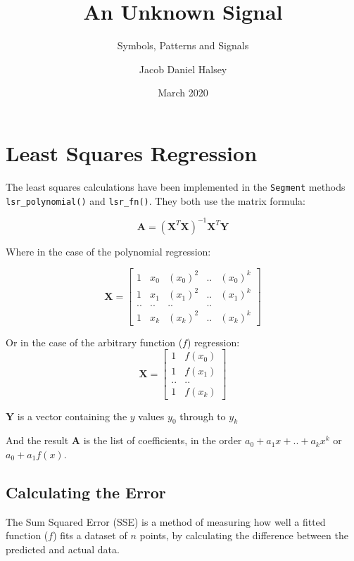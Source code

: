 \documentclass[11pt,a4paper]{scrartcl}
\title{An Unknown Signal}
\subtitle{Symbols, Patterns and Signals}
\author{Jacob Daniel Halsey}
\date{March 2020}
\begin{document}
	
\maketitle
	
\section{Least Squares Regression}

The least squares calculations have been implemented in the \lstinline|Segment| methods \lstinline|lsr_polynomial()| and \lstinline|lsr_fn()|.
They both use the matrix formula: \cite{wolfram_ls_poly}

\[\bm{A}=(\bm{X}^{T}\bm{X})^{-1}\bm{X}^{T}\bm{Y}\]

Where in the case of the polynomial regression:

\[
\bm{X} = \begin{bmatrix}
1 & x_{0} & \left (x_{0}  \right )^{2} & .. & \left (x_{0}  \right )^{k} \\ 
1 & x_{1} & \left (x_{1}  \right )^{2} & .. & \left (x_{1}  \right )^{k} \\ 
.. & .. & .. & .. \\ 
1 & x_{k} & \left (x_{k}  \right )^{2} & .. & \left (x_{k}  \right )^{k}
\end{bmatrix}\]

Or in the case of the arbitrary function ($f$) regression:
\[
\bm{X} = 
\begin{bmatrix}
1 & f\left (x_{0}  \right ) \\ 
1 & f\left (x_{1}  \right ) \\ 
.. & .. \\ 
1 & f\left (x_{k}  \right )
\end{bmatrix}
\]

$\bm{Y}$ is a vector containing the $y$ values $y_{0}$ through to $y_{k}$

And the result $\bm{A}$ is the list of coefficients, in the order $a_{0} + a_{1}x + .. + a_{k}x^{k}$ or $a_{0} + a_{1}f(x)$.

\subsection*{Calculating the Error}

The Sum Squared Error (SSE) is a method of measuring how well a fitted function ($f$) fits a dataset of $n$ points, by calculating the difference between the predicted and actual data. \cite{wolfram_ls_fitting}
\end{document}
